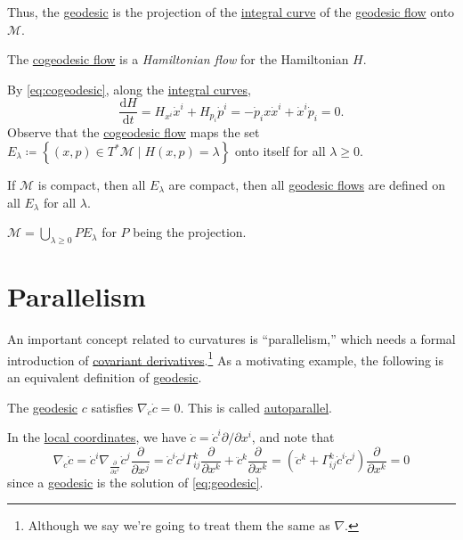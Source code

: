 Thus, the \hyperref[def:geodesic]{geodesic} is the projection of the \hyperref[def:integral-curve]{integral curve} of the \hyperref[def:geodesic-flow]{geodesic flow} onto \(\mathcal{M} \).

\begin{remark}
	The \hyperref[def:cogeodesic-flow]{cogeodesic flow} is a \emph{Hamiltonian flow} for the Hamiltonian \(H\).
\end{remark}
\begin{explanation}
	By \autoref{eq:cogeodesic}, along the \hyperref[def:integral-curve]{integral curves},
	\[
		\frac{\mathrm{d}H}{\mathrm{d}t}
		= H_{x^i} \dot{x}^i + H_{p_i}\dot{p}^i
		= -\dot{p}_i x\dot{x}^i + \dot{x}^i \dot{p}_i = 0.
	\]
	Observe that the \hyperref[def:cogeodesic-flow]{cogeodesic flow} maps the set \(E_\lambda \coloneqq \left\{ (x, p)\in T^{\ast} \mathcal{M} \mid H(x, p) = \lambda \right\}\) onto itself for all \(\lambda \geq 0\).
\end{explanation}

\begin{remark}
	If \(\mathcal{M} \) is compact, then all \(E_\lambda \) are compact, then all \hyperref[def:geodesic-flow]{geodesic flows} are defined on all \(E_\lambda \) for all \(\lambda \).
\end{remark}

\begin{remark}
	\(\mathcal{M} = \bigcup_{\lambda \geq 0} P E_\lambda \) for \(P\) being the projection.
\end{remark}

\section{Parallelism}
An important concept related to curvatures is ``parallelism,'' which needs a formal introduction of \hyperref[def:covariant-derivative]{covariant derivatives}.\footnote{Although we say we're going to treat them the same as \(\nabla \).} As a motivating example, the following is an equivalent definition of \hyperref[def:geodesic]{geodesic}.

\begin{eg}[Autoparallel]
	The \hyperref[def:geodesic]{geodesic} \(c\) satisfies \(\nabla _{\dot{c} } \dot{c} = 0\). This is called \hyperref[def:autoparallel]{autoparallel}.
\end{eg}
\begin{explanation}
	In the \hyperref[def:coordinate-chart]{local coordinates}, we have \(\dot{c} = \dot{c}^i \partial / \partial x^i\), and note that
	\begin{equation}\label{eq:autoparallel-geodesic}
		\nabla _{\dot{c}}\dot{c}
		= \dot{c}^i \nabla _{\frac{\partial }{\partial x^i} } \dot{c}^j \frac{\partial }{\partial x^j}
		= \dot{c}^i \dot{c}^j \Gamma _{ij}^k \frac{\partial }{\partial x^k} + \ddot{c}^k \frac{\partial }{\partial x^k}
		= \left( \ddot{c}^k + \Gamma _{ij}^k \dot{c}^i \dot{c}^j \right) \frac{\partial }{\partial x^k}
		= 0
	\end{equation}
	since a \hyperref[def:geodesic]{geodesic} is the solution of \autoref{eq:geodesic}.
\end{explanation}

